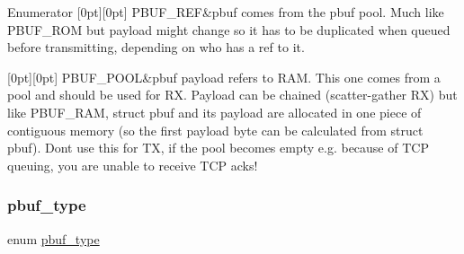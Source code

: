 \begin{DoxyEnumFields}{Enumerator}
[0pt][0pt]{}\mbox{\label{group__pbuf_ggab7e0e32fcc292c0d7107721766ed92fbac9b6ba960fdea6f2e8f35c8313b77e4e}} 
P\+B\+U\+F\+\_\+\+R\+EF&pbuf comes from the pbuf pool. Much like P\+B\+U\+F\+\_\+\+R\+OM but payload might change so it has to be duplicated when queued before transmitting, depending on who has a \textquotesingle{}ref\textquotesingle{} to it. \\
\hline

[0pt][0pt]{}\mbox{\label{group__pbuf_ggab7e0e32fcc292c0d7107721766ed92fbae969347127387b9b59a23ccd24b76d21}} 
P\+B\+U\+F\+\_\+\+P\+O\+OL&pbuf payload refers to R\+AM. This one comes from a pool and should be used for RX. Payload can be chained (scatter-\/gather RX) but like P\+B\+U\+F\+\_\+\+R\+AM, struct pbuf and its payload are allocated in one piece of contiguous memory (so the first payload byte can be calculated from struct pbuf). Don\textquotesingle{}t use this for TX, if the pool becomes empty e.\+g. because of T\+CP queuing, you are unable to receive T\+CP acks! \\
\hline

\end{DoxyEnumFields}
\mbox{\label{group__pbuf_gab7e0e32fcc292c0d7107721766ed92fb}} 
\subsubsection{\texorpdfstring{pbuf\+\_\+type}{pbuf\_type}\hspace{0.1cm}{\footnotesize\ttfamily [2/2]}}
{\footnotesize\ttfamily enum \hyperlink{group__pbuf_gab7e0e32fcc292c0d7107721766ed92fb}{pbuf\+\_\+type}}

